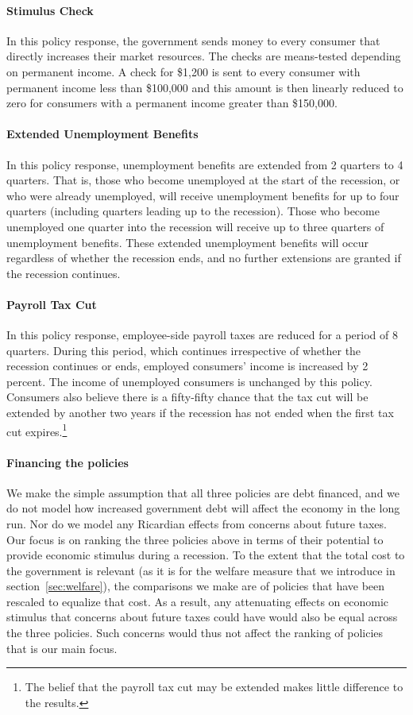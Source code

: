 \documentclass[../HAFiscal]{subfiles}
\begin{document}
	\paragraph{Stimulus Check} In this policy response, the government sends money to every consumer that directly increases their market resources. The checks are means-tested depending on permanent income. A check for \$1,200 is sent to every consumer with permanent income less than \$100,000 and this amount is then linearly reduced to zero for consumers with a permanent income greater than \$150,000.
	
	\paragraph{Extended Unemployment Benefits} In this policy response, unemployment benefits are extended from 2 quarters to 4 quarters. That is, those who become unemployed at the start of the recession, or who were already unemployed, will receive unemployment benefits for up to four quarters (including quarters leading up to the recession). Those who become unemployed one quarter into the recession will receive up to three quarters of unemployment benefits. These extended unemployment benefits will occur regardless of whether the recession ends, and no further extensions are granted if the recession continues.
	
	\paragraph{Payroll Tax Cut} In this policy response, employee-side payroll taxes are reduced for a period of 8 quarters. During this period, which continues irrespective of whether the recession continues or ends, employed consumers' income is increased by 2 percent. The income of unemployed consumers is unchanged by this policy. Consumers also believe there is a fifty-fifty chance that the tax cut will be extended by another two years if the recession has not ended when the first tax cut expires.\footnote{The belief that the payroll tax cut may be extended makes little difference to the results.}

	\paragraph{Financing the policies} We make the simple assumption that all three policies are debt financed, and we do not model how increased government debt will affect the economy in the long run. Nor do we model any Ricardian effects from concerns about future taxes. Our focus is on ranking the three policies above in terms of their potential to provide economic stimulus during a recession. To the extent that the total cost to the government is relevant (as it is for the welfare measure that we introduce in section~\ref{sec:welfare}), the comparisons we make are of policies that have been rescaled to equalize that cost. As a result, any attenuating effects on economic stimulus that concerns about future taxes could have would also be equal across the three policies. Such concerns would thus not affect the ranking of policies that is our main focus. 
\end{document}
